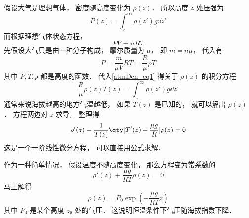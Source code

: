 

假设大气是理想气体， 密度随高度变化为 $\rho(z)$． 所以高度 $z$ 处压强为
\begin{equation}\label{atmDen_eq1}
P(z) = \int_{z}^\infty \rho(z') g \dd{z'}
\end{equation}
而根据理想气体状态方程，
\begin{equation}
PV = n R T
\end{equation}
先假设大气只是由一种分子构成， 摩尔质量为 $\mu$， 即 $m = n\mu$， 代入有
\begin{equation}
P = \frac{m}{\mu V} RT = \frac{R}{\mu} \rho T
\end{equation}
其中 $P, T, \rho$ 都是高度的函数． 代入\autoref{atmDen_eq1} 得关于 $\rho(z)$ 的积分方程
\begin{equation}
\frac{R}{\mu} \rho(z) T(z) = \int_{z}^\infty \rho(z') g \dd{z'}
\end{equation}
通常来说海拔越高的地方气温越低， 如果 $T(z)$ 是已知的， 就可以解出 $\rho(z)$． 方程两边对 $z$ 求导， 整理得
\begin{equation}
\rho'(z)  +  \frac{1}{T(z)}\qty[T'(z) + \frac{\mu g}{R}]\rho(z) = 0
\end{equation}
这是一个一阶线性微分方程， 可以直接用公式求解．

作为一种简单情况， 假设温度不随高度变化， 那么方程变为常系数的
\begin{equation}
\rho'(z)  +  \frac{\mu g}{RT}\rho(z) = 0
\end{equation}
马上解得
\begin{equation}
\rho(z) = P_0\exp(-\frac{\mu g}{RT} z)
\end{equation}
其中 $P_0$ 是某个高度 $z_0$ 处的气压． 这说明恒温条件下气压随海拔指数下降．
